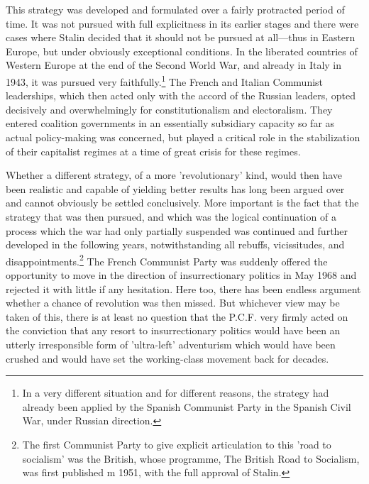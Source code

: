 This strategy was developed and formulated over a fairly protracted period of time. It was not pursued with full explicitness in its earlier stages and there were cases where Stalin decided that it should not be pursued at all—thus in Eastern Europe, but under obviously exceptional conditions. In the liberated countries of Western Europe at the end of the Second World War, and already in Italy in 1943, it was pursued very faithfully.\footnote{In a very different situation and for different reasons, the strategy had already been applied by the Spanish Communist Party in the Spanish Civil War, under Russian direction.} The French and Italian Communist leaderships, which then acted only with the accord of the Russian leaders, opted decisively and overwhelmingly for constitutionalism and electoralism. They entered coalition governments in an essentially subsidiary capacity so far as actual policy\hyp{}making was concerned, but played a critical role in the stabilization of their capitalist regimes at a time of great crisis for these regimes.

Whether a different strategy, of a more 'revolutionary' kind, would then have been realistic and capable of yielding better results has long been argued over and cannot obviously be settled conclusively. More important is the fact that the strategy that was then pursued, and which was the logical continuation of a process which the war had only partially suspended was continued and further developed in the following years, notwithstanding all rebuffs, vicissitudes, and disappointments.\footnote{The first Communist Party to give explicit articulation to this 'road to socialism' was the British, whose programme, The British Road to Socialism, was first published m 1951, with the full approval of Stalin.} The French Communist Party was suddenly offered the opportunity to move in the direction of insurrectionary politics in May 1968 and rejected it with little if any hesitation. Here too, there has been endless argument whether a chance of revolution was then missed. But whichever view may be taken of this, there is at least no question that the P.C.F. very firmly acted on the conviction that any resort to insurrectionary politics would have been an utterly irresponsible form of 'ultra-left' adventurism which would have been crushed and would have set the working-class movement back for decades.

